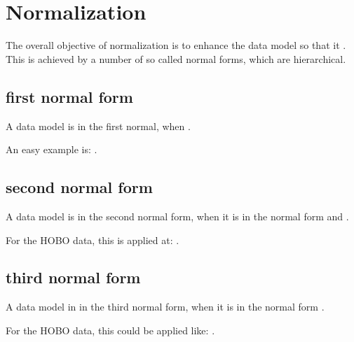 %
%
%
\section{Normalization}

The overall objective of normalization is to enhance the data model so that it \blank.
This is achieved by a number of so called normal forms, which are hierarchical.

\subsection{first normal form}

A data model is in the first normal, when \blank.

An easy example is: \blank.

\subsection{second normal form}

A data model is in the second normal form, when it is in the \blank normal form and \blank.

For the HOBO data, this is applied at: \blank. 

\subsection{third normal form}

A data model in in the third normal form, when it is in the \blank normal form \blank.

For the HOBO data, this could be applied like: \blank.